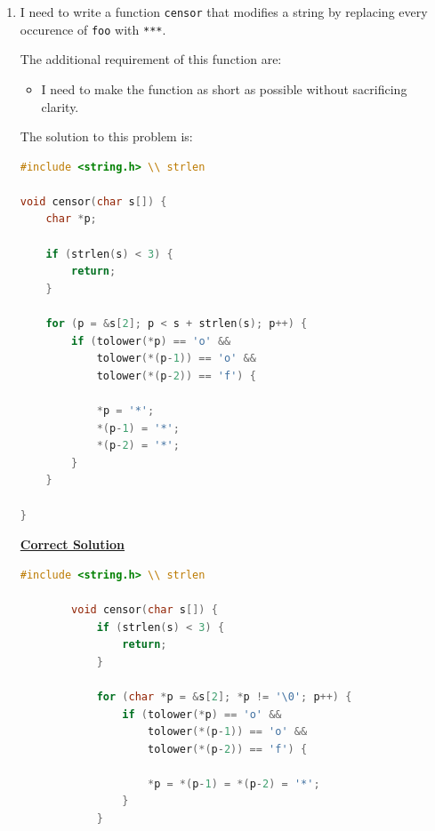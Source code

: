 \documentclass[12pt]{article}
\begin{document}
\begin{enumerate}[1.]
\begin{enumerate}[a)]
    \end{enumerate}

    \item

    I need to write a function \texttt{censor} that modifies a string by replacing
    every occurence of \texttt{foo} with \texttt{***}.

    \bigskip

    The additional requirement of this function are:

    \begin{itemize}
        \item I need to make the function as short as possible without sacrificing
        clarity.
    \end{itemize}

    \bigskip

    The solution to this problem is:

    \bigskip

\begin{lstlisting}[language=c]
#include <string.h> \\ strlen

void censor(char s[]) {
    char *p;

    if (strlen(s) < 3) {
        return;
    }

    for (p = &s[2]; p < s + strlen(s); p++) {
        if (tolower(*p) == 'o' &&
            tolower(*(p-1)) == 'o' &&
            tolower(*(p-2)) == 'f') {

            *p = '*';
            *(p-1) = '*';
            *(p-2) = '*';
        }
    }

}
\end{lstlisting}

    \bigskip


    \begin{mdframed}
    \underline{\textbf{Correct Solution}}

    \bigskip

    \begin{lstlisting}[language=c]
        #include <string.h> \\ strlen

        void censor(char s[]) {
            if (strlen(s) < 3) {
                return;
            }

            for (char *p = &s[2]; *p != '\0'; p++) {
                if (tolower(*p) == 'o' &&
                    tolower(*(p-1)) == 'o' &&
                    tolower(*(p-2)) == 'f') {

                    *p = *(p-1) = *(p-2) = '*';
                }
            }


\end{lstlisting}
\end{mdframed}
\end{enumerate}
\end{document}
